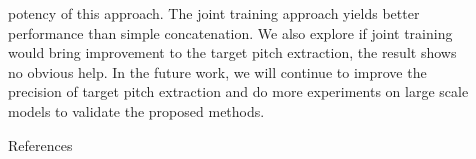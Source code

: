 \documentclass[final]{beamer}
\newlength{\sepwidth}
\newlength{\colwidth}
\newcommand{\separatorcolumn}{\begin{column}{\sepwidth}\end{column}}
\begin{document}
\begin{frame}[t]
\begin{columns}[t]
            \separatorcolumn

            \begin{column}{\colwidth}
                \begin{block}{}
                    potency of this approach. The joint training approach yields better performance than simple concatenation. We also explore if joint training would bring improvement to the target pitch extraction, the result shows no obvious help. In the future work, we will continue to improve the precision of target pitch extraction and do more experiments on large scale models to validate the proposed methods.
                \end{block}
                \begin{block}{References}

                    \footnotesize{}

                \end{block}
            \end{column}

            \separatorcolumn
        \end{columns}
    \end{frame}
\end{document}
